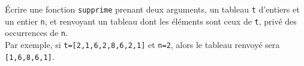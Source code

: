 \exer{}
\setcounter{numques}{0}

Écrire une fonction \texttt{supprime} prenant deux arguments, un tableau
\texttt{t} d'entiers et un entier \texttt{n}, et renvoyant un tableau dont les
éléments sont ceux de \texttt{t}, privé des occurrences de \texttt{n}.\\
Par exemple, si \texttt{t=[2,1,6,2,8,6,2,1]} et \texttt{n=2}, alors le tableau
renvoyé sera \texttt{[1,6,8,6,1]}.